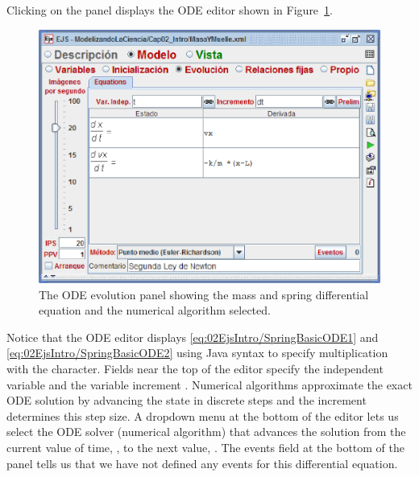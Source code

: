 Clicking on the  panel displays the ODE editor shown in
Figure~\ref{fig:02EjsIntro/ModelEvolution}.
\begin{figure}[htb]
    \centering
  \includegraphics[scale=\scale]{02EjsIntro/images/ModelEvolution.eps}
    \caption{The ODE evolution panel showing the mass and spring differential equation and the numerical algorithm selected.}
    \label{fig:02EjsIntro/ModelEvolution}
\end{figure}
Notice that the ODE editor displays \eqref{eq:02EjsIntro/SpringBasicODE1} and \eqref{eq:02EjsIntro/SpringBasicODE2}
using Java syntax to specify multiplication with the \lit{*} character. Fields near the top of the editor specify the
independent variable  and the variable increment .  Numerical algorithms approximate the exact ODE solution by advancing the state in discrete steps and the increment determines this step size. A dropdown menu at the bottom of the editor lets us select the ODE solver (numerical algorithm) that advances the solution from the current value of time, , to the next value, . The events field at the bottom of the panel tells us that we have
not defined any events for this differential equation.

